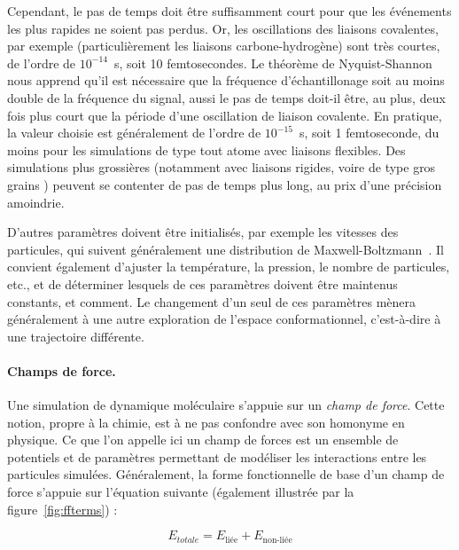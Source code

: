 	Cependant, le pas de temps doit être suffisamment court pour que les événements les plus rapides ne soient pas perdus. Or, les oscillations des liaisons covalentes, par exemple (particulièrement les liaisons carbone-hydrogène) sont très courtes, de l'ordre de $10^{-14}$~s, soit 10 femtosecondes. Le théorème de Nyquist-Shannon~\cite{shannon1949communication} nous apprend qu'il est nécessaire que la fréquence d'échantillonage soit au moins double de la fréquence du signal, aussi le pas de temps doit-il être, au plus, deux fois plus court que la période d'une oscillation de liaison covalente. En pratique, la valeur choisie est généralement de l'ordre de $10^{-15}$~s, soit 1 femtoseconde, du moins pour les simulations de type \og tout atome \fg{} avec liaisons flexibles. Des simulations plus grossières (notamment avec liaisons rigides, voire de type \og gros grains \fg{}) peuvent se contenter de pas de temps plus long, au prix d'une précision amoindrie.
	
	D'autres paramètres doivent être initialisés, par exemple les vitesses des particules, qui suivent généralement une distribution de Maxwell-Boltzmann~\cite{maxwell1860v, maxwell1860ii, boltzmann1970weitere, boltzmann2003further}. Il convient également d'ajuster la température, la pression, le nombre de particules, etc., et de déterminer lesquels de ces paramètres doivent être maintenus constants, et comment. Le changement d'un seul de ces paramètres mènera généralement à une autre exploration de l'espace conformationnel, c'est-à-dire à une trajectoire différente.
	
	\paragraph{Champs de force.}
	Une simulation de dynamique moléculaire s'appuie sur un \emph{champ de force}. Cette notion, propre à la chimie, est à ne pas confondre avec son homonyme en physique. Ce que l'on appelle ici un champ de forces est un ensemble de potentiels et de paramètres permettant de modéliser les interactions entre les particules simulées. Généralement, la forme fonctionnelle de base d'un champ de force s'appuie sur l'équation suivante (également illustrée par la figure~\ref{fig:ffterms}) :
	
	\begin{equation}
		\label{eq:forcefield}
		E_{totale} = E_\text{liée} + E_\text{non-liée}
	\end{equation}
	
